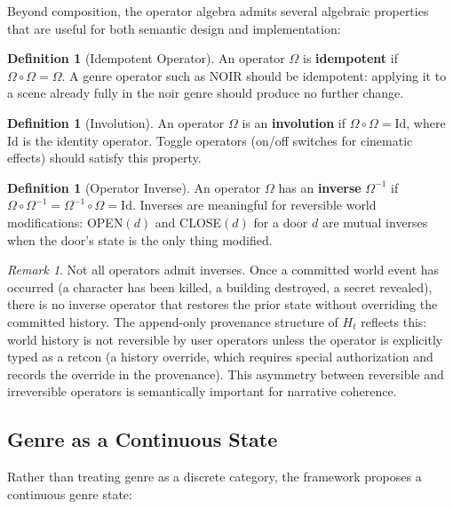 \documentclass[11pt,a4paper]{article}
\theoremstyle{plain}
\theoremstyle{definition}
\newtheorem{definition}[theorem]{Definition}
\theoremstyle{remark}
\newtheorem{remark}[theorem]{Remark}
\begin{document}
Beyond composition, the operator algebra admits several algebraic properties that are useful for both semantic design and implementation:

\begin{definition}[Idempotent Operator]
An operator $\Omega$ is \textbf{idempotent} if $\Omega \circ \Omega = \Omega$. A genre operator such as \textsc{NOIR} should be idempotent: applying it to a scene already fully in the noir genre should produce no further change.
\end{definition}

\begin{definition}[Involution]
An operator $\Omega$ is an \textbf{involution} if $\Omega \circ \Omega = \mathrm{Id}$, where $\mathrm{Id}$ is the identity operator. Toggle operators (on/off switches for cinematic effects) should satisfy this property.
\end{definition}

\begin{definition}[Operator Inverse]
An operator $\Omega$ has an \textbf{inverse} $\Omega^{-1}$ if $\Omega \circ \Omega^{-1} = \Omega^{-1} \circ \Omega = \mathrm{Id}$. Inverses are meaningful for reversible world modifications: \textsc{OPEN}$(d)$ and \textsc{CLOSE}$(d)$ for a door $d$ are mutual inverses when the door's state is the only thing modified.
\end{definition}

\begin{remark}
Not all operators admit inverses. Once a committed world event has occurred (a character has been killed, a building destroyed, a secret revealed), there is no inverse operator that restores the prior state without overriding the committed history. The append-only provenance structure of $H_t$ reflects this: world history is not reversible by user operators unless the operator is explicitly typed as a retcon (a history override, which requires special authorization and records the override in the provenance). This asymmetry between reversible and irreversible operators is semantically important for narrative coherence.
\end{remark}

\subsection{Genre as a Continuous State}

Rather than treating genre as a discrete category, the framework proposes a continuous genre state:
\end{document}
